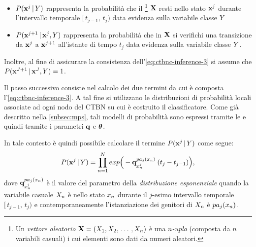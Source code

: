 \begin{itemize}
    \item $P(\mathbf{x}^j\,\arrowvert\,\mathnormal{Y})$ rappresenta la probabilità che il \emph{}\footnote{\label{note:vettore-aleatorio}Un \emph{vettore aleatorio} $\mathbf{X}=(\mathnormal{X}_1,\mathnormal{X}_2,\,\dotsc\,,\mathnormal{X}_n)$ è una $n$\emph{-upla} (composta da $n$ variabili casuali) i cui elementi sono dati da numeri aleatori.} $\mathbf{X}$ resti nello stato $\mathbf{x}^j$ durante l'intervallo temporale $[\,t_{j-1},\,t_j)$ data evidenza sulla variabile classe $\mathnormal{Y}$
    \item $P(\mathbf{x}^{j+1}\,\arrowvert\,\mathbf{x}^j,\mathnormal{Y})$ rappresenta la probabilità che in $\mathbf{X}$ si verifichi una transizione da $\mathbf{x}^j$ a $\mathbf{x}^{j+1}$ all'istante di tempo $t_j$ data evidenza sulla variabile classe $\mathnormal{Y}$.
\end{itemize}
Inoltre, al fine di assicurare la consistenza dell'\autoref{eq:ctbnc-inference-3} si assume che $P(\mathbf{x}^{J+1}\,\arrowvert\,\mathbf{x}^J,\mathnormal{Y})=1$.

Il passo successivo consiste nel calcolo dei due termini da cui è composta l'\autoref{eq:ctbnc-inference-3}. A tal fine si utilizzano le distribuzioni di probabilità locali associate ad ogni nodo del \acs{CTBN} su cui è costruito il classificatore. Come già descritto nella \autoref{subsec:mps}, tali modelli di probabilità sono espressi tramite le \cim{} e quindi tramite i parametri $\boldsymbol{\textbf{\text{q}}}$ e $\boldsymbol{\textbf{\text{$\theta$}}}$.

In tale contesto è quindi possibile calcolare il termine $P(\mathbf{x}^j\,\arrowvert\,\mathnormal{Y})$ come segue:
\begin{equation}\label{eq:ctbnc-inference-4}
P(\mathbf{x}^j\,\arrowvert\,\mathnormal{Y})=\prod_{n=1}^N exp\Big(-\boldsymbol{\textbf{\text{q}}}_{\mathnormal{x}_n^j}^{pa_j(\mathnormal{x}_n)}\:(t_j - t_{j-1})\Big)\text{,}
\end{equation}
dove $\boldsymbol{\textbf{\text{q}}}_{\mathnormal{x}_n^j}^{pa_j(\mathnormal{x}_n)}$ è il valore del parametro della \emph{distribuzione esponenziale} quando la variabile casuale $\mathnormal{X}_n$ è nello stato $\mathnormal{x}_n$ durante il $j$-esimo intervallo temporale $[\,t_{j-1},\,t_j)$ e contemporaneamente l'istanziazione dei genitori di $\mathnormal{X}_n$ è $pa_j(\mathnormal{x}_n)$.

